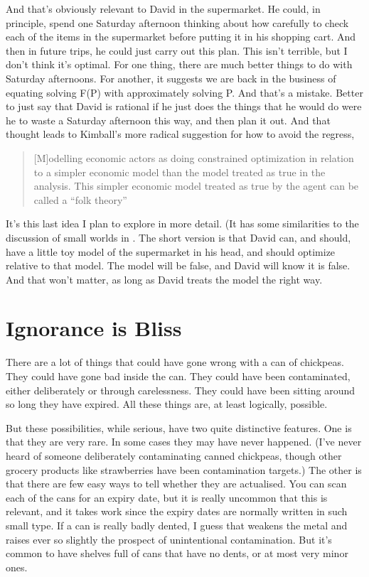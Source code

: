 \documentclass[
  11pt,
]{book}
\begin{document}
And that's obviously relevant to David in the supermarket. He could, in principle, spend one Saturday afternoon thinking about how carefully to check each of the items in the supermarket before putting it in his shopping cart. And then in future trips, he could just carry out this plan. This isn't terrible, but I don't think it's optimal. For one thing, there are much better things to do with Saturday afternoons. For another, it suggests we are back in the business of equating solving F(P) with approximately solving P. And that's a mistake. Better to just say that David is rational if he just does the things that he would do were he to waste a Saturday afternoon this way, and then plan it out. And that thought leads to Kimball's more radical suggestion for how to avoid the regress,

\begin{quote}
{[}M{]}odelling economic actors as doing constrained optimization in relation to a simpler economic model than the model treated as true in the analysis. This simpler economic model treated as true by the agent can be called a ``folk theory'' \citep[ 175]{Kimball2015}
\end{quote}

It's this last idea I plan to explore in more detail. (It has some similarities to the discussion of small worlds in \citep[ 70-77]{Joyce1999}. The short version is that David can, and should, have a little toy model of the supermarket in his head, and should optimize relative to that model. The model will be false, and David will know it is false. And that won't matter, as long as David treats the model the right way.

\hypertarget{ignorancebliss}{%
\section{Ignorance is Bliss}\label{ignorancebliss}}

There are a lot of things that could have gone wrong with a can of chickpeas. They could have gone bad inside the can. They could have been contaminated, either deliberately or through carelessness. They could have been sitting around so long they have expired. All these things are, at least logically, possible.

But these possibilities, while serious, have two quite distinctive features. One is that they are very rare. In some cases they may have never happened. (I've never heard of someone deliberately contaminating canned chickpeas, though other grocery products like strawberries have been contamination targets.) The other is that there are few easy ways to tell whether they are actualised. You can scan each of the cans for an expiry date, but it is really uncommon that this is relevant, and it takes work since the expiry dates are normally written in such small type. If a can is really badly dented, I guess that weakens the metal and raises ever so slightly the prospect of unintentional contamination. But it's common to have shelves full of cans that have no dents, or at most very minor ones.
\end{document}

